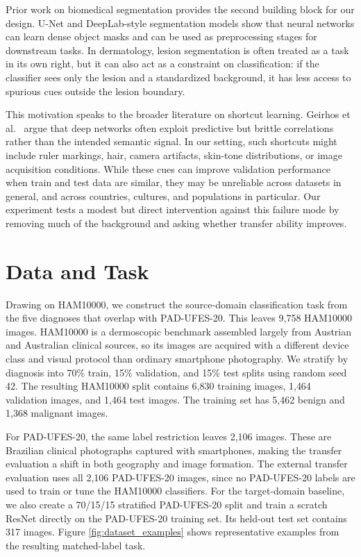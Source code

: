 \documentclass[10pt]{article}
\begin{document}
Prior work on biomedical segmentation provides the second building block for our design. U-Net \cite{ronneberger2015unet} and DeepLab-style segmentation models \cite{chen2017deeplabv3} show that neural networks can learn dense object masks and can be used as preprocessing stages for downstream tasks. In dermatology, lesion segmentation is often treated as a task in its own right, but it can also act as a constraint on classification: if the classifier sees only the lesion and a standardized background, it has less access to spurious cues outside the lesion boundary.

This motivation speaks to the broader literature on shortcut learning. Geirhos et al.\ \cite{geirhos2020shortcut} argue that deep networks often exploit predictive but brittle correlations rather than the intended semantic signal. In our setting, such shortcuts might include ruler markings, hair, camera artifacts, skin-tone distributions, or image acquisition conditions. While these cues can improve validation performance when train and test data are similar, they may be unreliable across datasets in general, and across countries, cultures, and populations in particular. Our experiment tests a modest but direct intervention against this failure mode by removing much of the background and asking whether transfer ability improves.

\section{Data and Task}

Drawing on HAM10000, we construct the source-domain classification task from the five diagnoses that overlap with PAD-UFES-20. This leaves 9{,}758 HAM10000 images. HAM10000 is a dermoscopic benchmark assembled largely from Austrian and Australian clinical sources, so its images are acquired with a different device class and visual protocol than ordinary smartphone photography. We stratify by diagnosis into 70\% train, 15\% validation, and 15\% test splits using random seed 42. The resulting HAM10000 split contains 6{,}830 training images, 1{,}464 validation images, and 1{,}464 test images. The training set has 5{,}462 benign and 1{,}368 malignant images.

For PAD-UFES-20, the same label restriction leaves 2{,}106 images. These are Brazilian clinical photographs captured with smartphones, making the transfer evaluation a shift in both geography and image formation. The external transfer evaluation uses all 2{,}106 PAD-UFES-20 images, since no PAD-UFES-20 labels are used to train or tune the HAM10000 classifiers. For the target-domain baseline, we also create a 70/15/15 stratified PAD-UFES-20 split and train a scratch ResNet directly on the PAD-UFES-20 training set. Its held-out test set contains 317 images. Figure \ref{fig:dataset_examples} shows representative examples from the resulting matched-label task.
\end{document}
